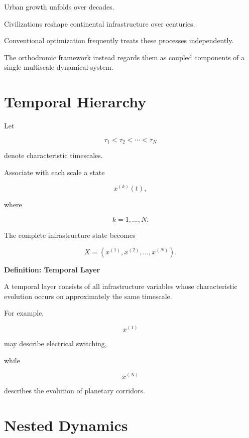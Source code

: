 \documentclass[11pt,fleqn]{book}
\numberwithin{equation}{chapter}
\newenvironment{definition}[1]
  {\begin{definitionEnv}
   \noindent\textbf{Definition: #1}\par\smallskip}
  {\end{definitionEnv}}
\theoremstyle{plain}
\theoremstyle{definition}
\theoremstyle{remark}
\begin{document}
Urban growth unfolds over decades.

Civilizations reshape continental infrastructure over centuries.

Conventional optimization frequently treats these processes
independently.

The orthodromic framework instead regards them as coupled components of
a single multiscale dynamical system.


\section{Temporal Hierarchy}

Let

\[
\tau_1
<
\tau_2
<
\cdots
<
\tau_N
\]

denote characteristic timescales.

Associate with each scale a state

\[
x^{(k)}(t),
\]

where

\[
k=1,\ldots,N.
\]

The complete infrastructure state becomes

\[
\boxed{
X
=
\left(
x^{(1)},
x^{(2)},
\ldots,
x^{(N)}
\right).
}
\]


\begin{definition}{Temporal Layer}

A temporal layer consists of all infrastructure variables whose
characteristic evolution occurs on approximately the same timescale.

\end{definition}


For example,

\[
x^{(1)}
\]

may describe electrical switching,

while

\[
x^{(N)}
\]

describes the evolution of planetary corridors.


\section{Nested Dynamics}
\end{document}
